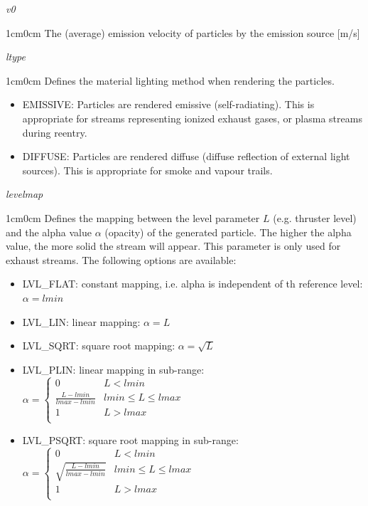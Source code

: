 \documentclass[Orbiter Developer Manual.tex]{subfiles}
\begin{document}
\noindent
\textit{v0}
\begin{adjustwidth}{1cm}{0cm}
The (average) emission velocity of particles by the emission source [m/s]
\\
\end{adjustwidth}

\noindent
\textit{ltype}
\begin{adjustwidth}{1cm}{0cm}
Defines the material lighting method when rendering the particles.

\begin{itemize}
\item EMISSIVE: Particles are rendered emissive (self-radiating). This is appropriate for streams representing ionized exhaust gases, or plasma streams during reentry.
\item DIFFUSE: Particles are rendered diffuse (diffuse reflection of external light sources). This is appropriate for smoke and vapour trails.
\end{itemize}
\end{adjustwidth}

\noindent
\textit{levelmap}
\begin{adjustwidth}{1cm}{0cm}
Defines the mapping between the level parameter $L$ (e.g. thruster level) and the alpha value $\alpha$ (opacity) of the generated particle. The higher the alpha value, the more solid the stream will appear. This parameter is only used for exhaust streams. The following options are available:

\begin{itemize}
\item LVL\_FLAT: constant mapping, i.e. alpha is independent of th reference level: $\alpha = lmin$
\item LVL\_LIN: linear mapping: $\alpha = L$
\item LVL\_SQRT: square root mapping: $\alpha = \sqrt{L}$
\item LVL\_PLIN: linear mapping in sub-range: $\alpha = 
\left\{
\begin{array}{ll}
	0 & L < lmin \\
	\frac{L - lmin}{lmax - lmin} & lmin \leq L \leq lmax \\
	1 & L > lmax \\
\end{array} 
\right. $
\item LVL\_PSQRT: square root mapping in sub-range: $\alpha =
\left\{
\begin{array}{ll}
	0 & L < lmin \\
	\sqrt{\frac{L - lmin}{lmax - lmin}} & lmin \leq L \leq lmax \\
	1 & L > lmax \\
\end{array} 
\right. $
\end{itemize}
\end{adjustwidth}
\end{document}

